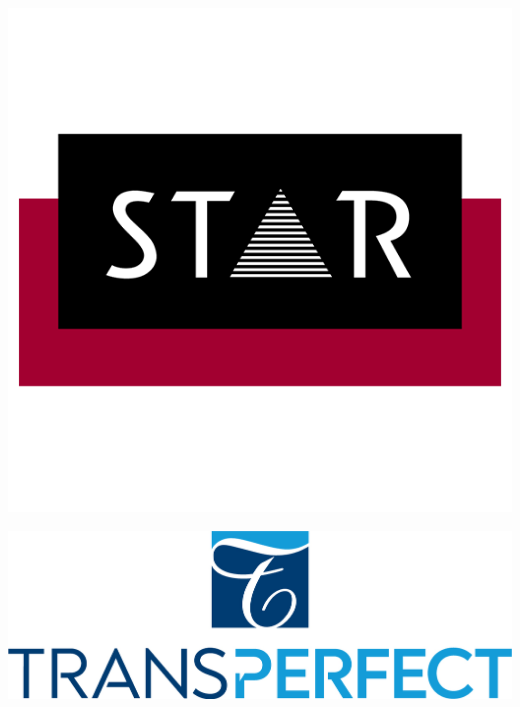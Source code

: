 \documentclass[11pt,oneside]{book}
\begin{document}
\begin{samepage}
\begin{minipage}[c][0.21\linewidth][c]{0.17\linewidth}
      \includegraphics[width=\linewidth]{eamt_volume_1/sponsor_logos/STAR-Signet-rgb.png}
    \end{minipage}\hspace{0.05\linewidth}
    \begin{minipage}[c][0.21\linewidth][c]{0.17\linewidth}
      \includegraphics[width=\linewidth]{eamt_volume_1/sponsor_logos/TP_stacked_logo RGB-01.jpg}
    \end{minipage}\hspace{0.05\linewidth}
          
    \end{samepage}
\end{document}
